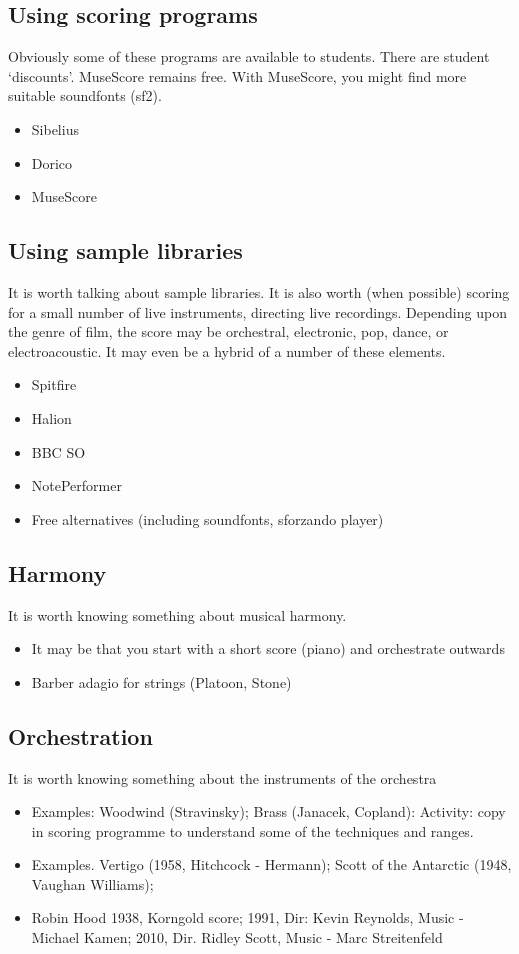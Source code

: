 \subsection{Using scoring programs}
Obviously some of these programs are available to students. There are student `discounts'. MuseScore remains free.
With MuseScore, you might find more suitable soundfonts (sf2). 
\begin{itemize}
\item Sibelius
\item Dorico
\item MuseScore
\end{itemize}


\subsection{Using sample libraries}
It is worth talking about sample libraries. It is also worth (when possible) scoring for a small number of live instruments, directing live recordings. Depending upon the genre of film, the score may be orchestral, electronic, pop, dance, or electroacoustic. It may even be a hybrid of a number of these elements. 
\begin{itemize}
\item Spitfire
\item Halion
\item BBC SO
\item NotePerformer
\item Free alternatives (including soundfonts, sforzando player)
\end{itemize}

\subsection{Harmony}
It is worth knowing something about musical harmony.
\begin{itemize}
\item It may be that you start with a short score (piano) and orchestrate outwards
\item Barber adagio for strings (Platoon, Stone)
\end{itemize}

\subsection{Orchestration}
It is worth knowing something about the instruments of the orchestra
\begin{itemize}
\item Examples: Woodwind (Stravinsky); Brass (Janacek, Copland): Activity: copy in scoring programme to understand some of the techniques and ranges.
\item Examples. Vertigo (1958, Hitchcock - Hermann); Scott of the Antarctic (1948, Vaughan Williams); 
\item Robin Hood 1938, Korngold score; 1991, Dir: Kevin Reynolds, Music - Michael Kamen; 2010, Dir. Ridley Scott, Music - Marc Streitenfeld  
\end{itemize}


